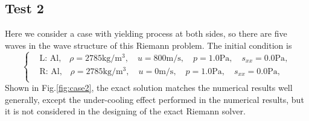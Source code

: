 \documentclass[review]{elsarticle}
\numberwithin{equation}{section}
\numberwithin{table}{section}
\begin{document}
\subsection{Test 2}
Here we consider a case with yielding process at both sides, so there are five waves in the wave structure of this Riemann problem. The initial condition is
\begin{equation}
 \left\{ \begin{aligned}
	 &	 \text{L: Al,}\quad  \rho = 2785 \text{kg}/\text{m}^3, \quad  u = 800\text{m}/\text{s}, \quad  p = 1.0\text{Pa}, \quad  s_{xx}=0.0 \text{Pa},\\
&	 \text{R: Al,}\quad  \rho = 2785 \text{kg}/\text{m}^3, \quad  u = 0\text{m}/\text{s}, \quad  p = 1.0\text{Pa}, \quad  s_{xx}=0.0 \text{Pa},\\
   \end{aligned}
 \right.
\end{equation}
Shown in Fig.\ref{fig:case2}, the exact solution matches the numerical results well generally, except the under-cooling effect performed in the numerical results, but it is not considered in the designing of the exact Riemann solver.
\end{document}
